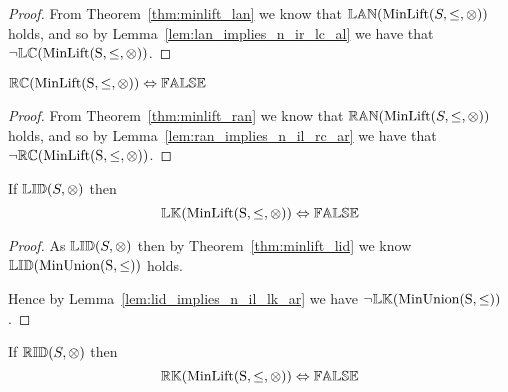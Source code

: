 \begin{proof}

\vspace{0.5em}
From Theorem~\ref{thm:minlift_lan} we know that ${\mathbb{LAN}}(\mathrm{MinLift}(S,\leq,\otimes))$ holds, and so by Lemma~\ref{lem:lan_implies_n_ir_lc_al} we have that $\neg {\mathbb{LC}}(\mathrm{MinLift(S,\leq,\otimes)})$.
\end{proof}





\begin{theorem} \label{thm:minlift_rc}
${\mathbb{RC}}(\mathrm{MinLift(S,\leq,\otimes)}) \Leftrightarrow {\mathbb{FALSE}}$
\end{theorem}

\begin{proof}

\vspace{0.5em}
From Theorem~\ref{thm:minlift_ran} we know that ${\mathbb{RAN}}(\mathrm{MinLift}(S,\leq,\otimes))$ holds, and so by Lemma~\ref{lem:ran_implies_n_il_rc_ar} we have that $\neg {\mathbb{RC}}(\mathrm{MinLift(S,\leq,\otimes)})$.
\end{proof}





\begin{theorem} \label{thm:minlift_lk}
If ${\mathbb{LID}}(S,\otimes)$ then
\begin{equation*}
{\mathbb{LK}}(\mathrm{MinLift(S,\leq,\otimes)}) \Leftrightarrow {\mathbb{FALSE}}
\end{equation*}
\end{theorem}

\begin{proof}

\vspace{0.5em}
As ${\mathbb{LID}}(S, \otimes)$ then by Theorem~\ref{thm:minlift_lid} we know ${\mathbb{LID}}(\mathrm{MinUnion(S,\leq)})$ holds.

\vspace{0.5em}
Hence by Lemma~\ref{lem:lid_implies_n_il_lk_ar} we have $\neg {\mathbb{LK}}(\mathrm{MinUnion(S,\leq)})$.
\end{proof}





\begin{theorem} \label{thm:minlift_rk}
If ${\mathbb{RID}}(S,\otimes)$ then
\begin{equation*}
{\mathbb{RK}}(\mathrm{MinLift(S,\leq,\otimes)}) \Leftrightarrow {\mathbb{FALSE}}
\end{equation*}
\end{theorem}

